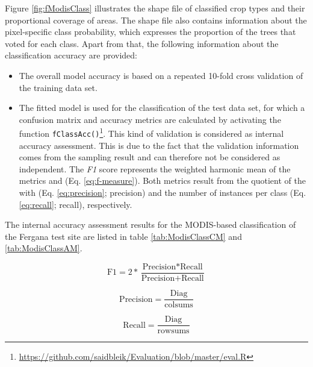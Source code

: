 Figure \ref{fig:fModisClass} illustrates the shape file of classified crop types and their  proportional coverage of areas. The shape file also contains information about the pixel-specific class probability, which expresses the proportion of the trees that voted for each class. Apart from that, the following information about the classification accuracy are provided:


\begin{itemize}
\item The overall model accuracy is based on a repeated 10-fold cross validation of the training data set.  
\item The fitted model is used for the classification of the test data set, for which a confusion matrix and accuracy metrics are calculated  by activating the function \texttt{fClassAcc()}\footnote{\url{https://github.com/saidbleik/Evaluation/blob/master/eval.R}}. This kind of validation is considered as internal accuracy assessment. This is due to the fact that the validation information comes from the sampling result and can therefore not be considered as independent.
The  \textit{F1} score represents the weighted harmonic mean of the metrics  and  (Eq. \eqref{eq:f-measure}). Both metrics result from the quotient of the  with   (Eq. \eqref{eq:precision}; precision) and {the number of instances per class} (Eq. \eqref{eq:recall}; recall), respectively.
\end{itemize}

The internal accuracy assessment results for the MODIS-based classification of the Fergana test site are listed in table  \ref{tab:ModisClassCM} and \ref{tab:ModisClassAM}.

\begin{equation}
\label{eq:f-measure}
\text{F1} = 2 * \frac{\text{Precision} * \text{Recall}}{\text{Precision} + \text{Recall}}
\end{equation}



\begin{equation}
\label{eq:precision}
\text{Precision} = \frac{\text{Diag}}{\text{colsums}}
\end{equation}

\begin{equation}
\label{eq:recall}
   \text{Recall} = \frac{\text{Diag}}{\text{rowsums}} 
\end{equation}


